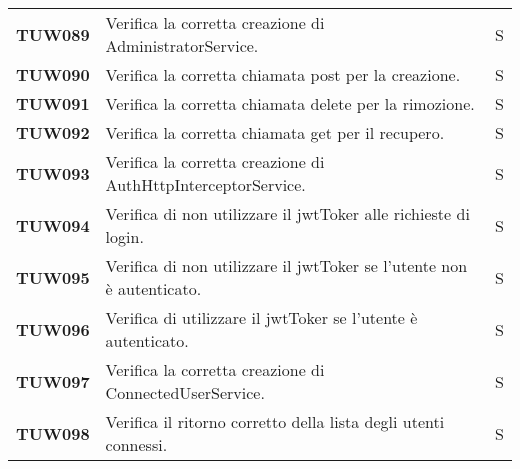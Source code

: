 \documentclass[../../piano-di-qualifica.tex]{subfiles}
\begin{document}
\begin{longtable}[H]{>{\centering\bfseries}m{3cm} >{}m{10cm} >{\centering\arraybackslash}m{3cm}}

  TUW089             & Verifica la corretta creazione di AdministratorService.                                                             & S                             \\

  TUW090             & Verifica la corretta chiamata post per la creazione.                                                                & S                             \\

  TUW091             & Verifica la corretta chiamata delete per la rimozione.                                                              & S                             \\

  TUW092             & Verifica la corretta chiamata get per il recupero.                                                                  & S                             \\


  TUW093             & Verifica la corretta creazione di AuthHttpInterceptorService.                                                       & S                             \\

  TUW094             & Verifica di non utilizzare il jwtToker alle richieste di login.                                                     & S                             \\

  TUW095             & Verifica di non utilizzare il jwtToker se l'utente non è autenticato.                                               & S                             \\

  TUW096             & Verifica di utilizzare il jwtToker se l'utente è autenticato.                                                       & S                             \\


  TUW097             & Verifica la corretta creazione di ConnectedUserService.                                                             & S                             \\

  TUW098             & Verifica il ritorno corretto della lista degli utenti connessi.                                                     & S                             \\


\end{longtable}
\end{document}
